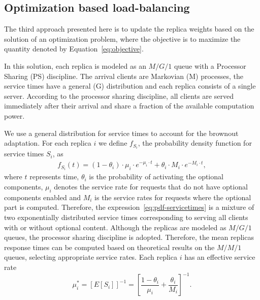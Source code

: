 
\subsection{Optimization based load-balancing}

The third approach presented here is to update the replica weights
based on the solution of an optimization problem, where the objective
is to maximize the quantity denoted by Equation~\eqref{eq:objective}.

In this solution, each replica is modeled as an $M/G/1$ queue with a
Processor Sharing (PS) discipline. The arrival clients are Markovian
(M) processes, the service times have a general (G) distribution and
each replica consists of a single server. According to the processor
sharing discipline, all clients are served immediately after their
arrival and share a fraction of the available computation power.

We use a general distribution for service times to account for the
brownout adaptation. For each replica $i$ we define $f_{S_i}$, the
probability density function for service times $S_i$, as
\begin{align}
  f_{S_i} (t) = (1 - \theta_i) \cdot \mu_i \cdot e^{-\mu_i \cdot t} +
  \theta_i \cdot M_i \cdot e^{-M_i \cdot t} ,
\label{eq:pdf-servicetimes}
\end{align}
where $t$ represents time, $\theta_i$ is the probability of activating
the optional components, $\mu_i$ denotes the service rate for requests
that do not have optional components enabled and $M_i$ is the service
rates for requests where the optional part is computed. Therefore, the
expression~\eqref{eq:pdf-servicetimes} is a mixture of two
exponentially distributed service times corresponding to serving all
clients with or without optional content. Although the replicas are
modeled as $M/G/1$ queues, the processor sharing discipline is
adopted. Therefore, the mean replicas response times can be computed
based on theoretical results on the $M/M/1$ queues, selecting
appropriate service rates. Each replica $i$ has an effective service
rate
\begin{equation}
  \mu_i^* = \left[ E[S_i] \right]^{-1} = \left[ \frac{1-\theta_i}{\mu_i}
    + \frac{\theta_i}{M_i} \right]^{-1} .
  \label{eq:effective-service-rate}
\end{equation}

